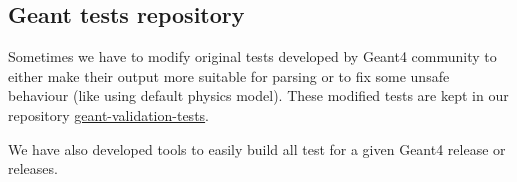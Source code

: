 

%


\subsection{Geant tests repository}
\label{sec-geant-validation-tests}

Sometimes we have to modify original tests developed by Geant4 community to either make their output more suitable for parsing or to fix some unsafe behaviour (like using default physics model). These modified tests are kept in our repository \href{https://gitlab.cern.ch/GeantValidation/geant-validation-tests}{geant-validation-tests}.

We have also developed tools to easily build all test for a given Geant4 release or releases.
